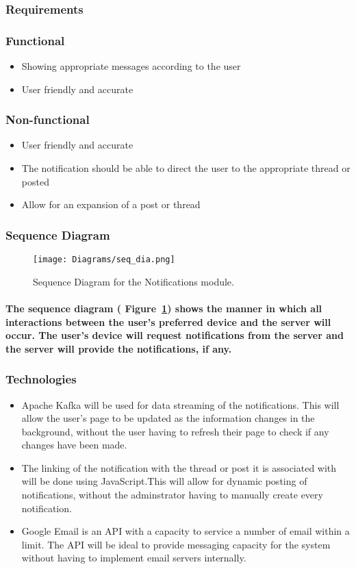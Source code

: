 \documentclass[12pt]{article}
\begin{document}
\subsubsection{Requirements}
\subsubsection*{Functional}
\begin{itemize}
\item Showing appropriate messages according to the user
\item User friendly and accurate
\end{itemize}
\subsubsection*{Non-functional}
\begin{itemize}
\item User friendly and accurate
\item The notification should be able to direct the user to the appropriate thread or posted
\item Allow for an expansion of a post or thread 
\end{itemize}
\subsubsection{Sequence Diagram}
\begin{figure}[h]
\texttt{[image: Diagrams/seq\_dia.png]}
\caption{Sequence Diagram for the Notifications module.}
\label{seq_dia}
\end{figure}
\paragraph{The sequence diagram ( Figure~\ref{seq_dia}) shows the manner in which all interactions between the user's preferred device and the server will occur. The user's device will request notifications from the server and the server will provide the notifications, if any.}

\subsubsection{Technologies}
\begin{itemize}
\item Apache Kafka will be used for data streaming of the notifications. This will allow the user's page to be updated as the information changes in the background, without the user having to refresh their page to check if any changes have been made.
\item The linking of the notification with the thread or post it is associated with will be done using JavaScript.This will allow for dynamic posting of notifications, without the adminstrator having to manually create every notification.
\item Google Email is an API with a capacity to service a number of email within a limit. The API will be ideal to provide messaging capacity for the system without having to implement email servers internally.
\end{itemize}
\end{document}
